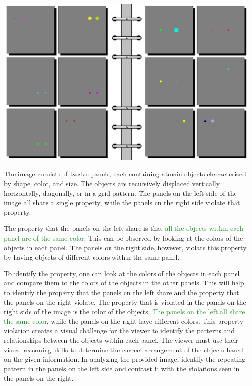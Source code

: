 \begin{tcolorbox}[breakable,enhanced jigsaw,opacityback=0,]
	\centering
	\includegraphics[width=.8\linewidth]{imgs/bongard/easy-16.png}\\
	\begin{dialogue}
		 The image consists of twelve panels, each containing atomic objects characterized by shape, color, and size. The objects are recursively displaced vertically, horizontally, diagonally, or in a grid pattern. The panels on the left side of the image all share a single property, while the panels on the right side violate that property.
		
		The property that the panels on the left share is that \textcolor{ForestGreen}{all the objects within each panel are of the same color}. This can be observed by looking at the colors of the objects in each panel. The panels on the right side, however, violate this property by having objects of different colors within the same panel.
		
		To identify the property, one can look at the colors of the objects in each panel and compare them to the colors of the objects in the other panels. This will help to identify the property that the panels on the left share and the property that the panels on the right violate.
		\vspace{1em}
		 The property that is violated in the panels on the right side of the image is the color of the objects. \textcolor{ForestGreen}{The panels on the left all share the same color}, while the panels on the right have different colors. This property violation creates a visual challenge for the viewer to identify the patterns and relationships between the objects within each panel. The viewer must use their visual reasoning skills to determine the correct arrangement of the objects based on the given information.
		\vspace{1em}
		 In analyzing the provided image, identify the repeating pattern in the panels on the left side and contrast it with the violations seen in the panels on the right.
		

\end{dialogue}
\end{tcolorbox}
